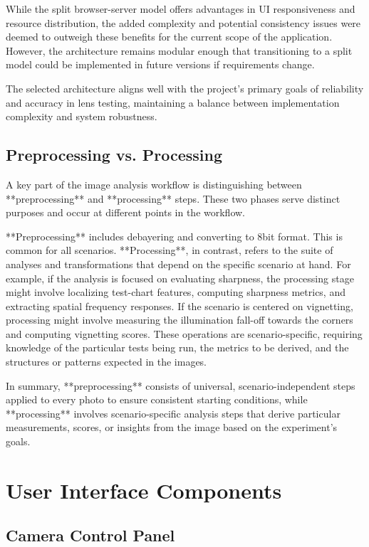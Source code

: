 While the split browser-server model offers advantages in UI responsiveness and resource distribution, the added complexity and potential consistency issues were deemed to outweigh these benefits for the current scope of the application. However, the architecture remains modular enough that transitioning to a split model could be implemented in future versions if requirements change.

The selected architecture aligns well with the project's primary goals of reliability and accuracy in lens testing, maintaining a balance between implementation complexity and system robustness.

\subsection{Preprocessing vs. Processing}

A key part of the image analysis workflow is distinguishing between **preprocessing** and **processing** steps. These two phases serve distinct purposes and occur at different points in the workflow.

**Preprocessing** includes debayering and converting to 8bit format. This is common for all scenarios.
**Processing**, in contrast, refers to the suite of analyses and transformations that depend on the specific scenario at hand. For example, if the analysis is focused on evaluating sharpness, the processing stage might involve localizing test-chart features, computing sharpness metrics, and extracting spatial frequency responses. If the scenario is centered on vignetting, processing might involve measuring the illumination fall-off towards the corners and computing vignetting scores. These operations are scenario-specific, requiring knowledge of the particular tests being run, the metrics to be derived, and the structures or patterns expected in the images.

In summary, **preprocessing** consists of universal, scenario-independent steps applied to every photo to ensure consistent starting conditions, while **processing** involves scenario-specific analysis steps that derive particular measurements, scores, or insights from the image based on the experiment’s goals.

\section{User Interface Components}

\subsection{Camera Control Panel}

